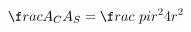 \documentclass[preview]{standalone}
\begin{document}
\begin{align*}
\f r ac{ A_C }{ A_S } = \f r ac{\ pi   r ^2}{4 r ^2}
\end{align*}
\end{document}
